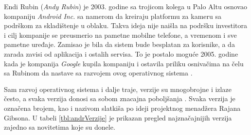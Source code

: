 \documentclass[android.tex]{subfiles}
\begin{document}
Endi Rubin (\textit{Andy Rubin}) je 2003. godine sa trojicom kolega u Palo Altu osnovao kompaniju \textit{Android Inc. }sa namerom da kreiraju platformu za kameru sa podrškom za skladištenje u oblaku. Takva ideja nije naišla na podršku investitora i cilj kompanije se preusmerio na  pametne mobilne telefone, a vremenom i sve pametne uređaje. Zamisao je bila da sistem bude besplatan za korisnike, a da zarada zavisi od aplikacija i ostalih servisa. To je postalo moguće 2005. godine kada je kompanija \textit{Google} kupila kompaniju i ostavila priliku osnivačima na čelu sa Rubinom da nastave sa razvojem ovog operativnog sistema \cite{book:krajci}. 

Sam razvoj operativnog sistema i dalje traje, verzije su mnogobrojne i izlaze često, a svaka verzija donosi sa sobom znacajna poboljšanja
 \cite{sajt:androidDevelopers,book:mzivkovic}.  Svaka verzija je označena brojem, kao i nazivom slatkiša po ideji projektnog menadžera Rajana Gibsona. U tabeli \ref{tbl:andrVerzije} je prikazan pregled najznačajnijih verzija zajedno sa novitetima koje su donele. 
\end{document}
